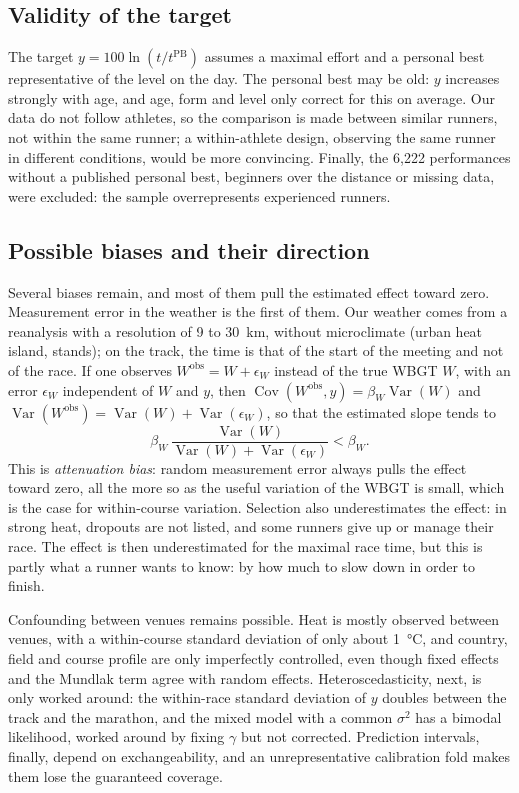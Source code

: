 \documentclass[11pt,a4paper]{article}
\DeclareMathOperator{\Var}{Var}
\DeclareMathOperator{\Cov}{Cov}
\newcommand{\PB}{\mathrm{PB}}
\begin{document}
\subsection{Validity of the target}\label{sec:target_validity}

The target $y = 100\ln(t/t^{\PB})$ assumes a maximal effort and a personal best representative of the level on the day.
The personal best may be old: $y$ increases strongly with age, and age, form and level only correct for this on
average. Our data do not follow athletes, so the comparison is made between similar runners, not within the same
runner; a within-athlete design, observing the same runner in different conditions, would be more convincing. Finally,
the 6,222 performances without a published personal best, beginners over the distance or missing data, were excluded:
the sample overrepresents experienced runners.

\subsection{Possible biases and their direction}\label{sec:biases}

Several biases remain, and most of them pull the estimated effect toward zero. Measurement error in the weather is the
first of them. Our weather comes from a reanalysis with a resolution of 9 to 30~km, without microclimate (urban heat
island, stands); on the track, the time is that of the start of the meeting and not of the race. If one observes
$W^{\text{obs}} = W + \epsilon_W$ instead of the true WBGT $W$, with an error $\epsilon_W$ independent of $W$ and $y$,
then $\Cov(W^{\text{obs}}, y) = \beta_W \Var(W)$ and $\Var(W^{\text{obs}}) = \Var(W) + \Var(\epsilon_W)$, so that the
estimated slope tends to
\[
\beta_W\,\frac{\Var(W)}{\Var(W) + \Var(\epsilon_W)} < \beta_W .
\]
This is \emph{attenuation bias}: random measurement error always pulls the effect toward zero, all the more so as the
useful variation of the WBGT is small, which is the case for within-course variation. Selection also underestimates the
effect: in strong heat, dropouts are not listed, and some runners give up or manage their race. The effect is then
underestimated for the maximal race time, but this is partly what a runner wants to know: by how much to slow down in
order to finish.

Confounding between venues remains possible. Heat is mostly observed between venues, with a within-course standard
deviation of only about 1~°C, and country, field and course profile are only imperfectly controlled, even though fixed
effects and the Mundlak term agree with random effects. Heteroscedasticity, next, is only worked around: the
within-race standard deviation of $y$ doubles between the track and the marathon, and the mixed model with a common
$\sigma^2$ has a bimodal likelihood, worked around by fixing $\gamma$ but not corrected. Prediction intervals, finally,
depend on exchangeability, and an unrepresentative calibration fold makes them lose the guaranteed coverage.
\end{document}
